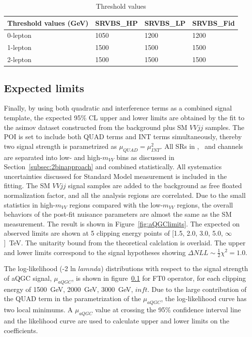 \begin{table}[ht!]
\small
\begin{center}
\begin{tabular}{ | l || l | l | l |}
\hline
Threshold values (GeV)          & SRVBS\_HP  & SRVBS\_LP & SRVBS\_Fid  \tabularnewline \hline
0-lepton & 1050      & 1200     & 1200       \tabularnewline \hline
1-lepton & 1500      & 1500     & 1500       \tabularnewline \hline
2-lepton & 1500      & 1500     & 1500       \tabularnewline \hline
\end{tabular}
\caption{Threshold values}
\label{tab:2binthreshold}
\end{center}
\end{table}

\subsection{Expected limits}
Finally, by using both quadratic and interference terms as a combined signal template, the expected 95\% CL upper and lower limits are obtained by the fit to the asimov dataset constructed from the background plus SM $VVjj$ samples.
The POI is set to include both QUAD terms and INT terms simultaneously, thereby two signal strength is parametrized as $\mu_{QUAD} = \mu_{INT}^2$.
All SRs in \zlep, \olep\ and \tlep channels are separated into low- and high-$m_{VV}$ bins as discussed in Section~\ref{subsec:2binapproach} and combined statistically.
All systematics uncertainties discussed for Standard Model measurement is included in the fitting.
The SM $VVjj$ signal samples are added to the background as free floated normalization factor, and all the analysis regions are correlated.
Due to the small statistics in high-$m_{VV}$ regions compared with the low-$m_{VV}$ regions,
the overall behaviors of the post-fit nuisance parameters are almost the same as the SM measurement.
The result is shown in Figure~\ref{fig:aQGClimits}.
The expected on abserved limits are shown at 5 clipping energy points of [1.5, 2.0, 3.0, 5.0, $\infty$]~TeV.
The unitarity bound from the theoretical calclation \cite{PhysRevD.101.113003} is overlaid.
The upper and lower limits correspond to the signal hypotheses showing $\Delta NLL \sim \frac{1}{2}\chi^2 = 1.0$.

The log-likelihood (-2 ln $lamnda$) distributions with respect to the signal strength of aQGC signal, $\mu_{aQGC}$, is shown in figure~\ref{} for FT0 operator, for each clipping energy of 1500~GeV, 2000~GeV, 3000~GeV, $inft$.
Due to the large contribution of the QUAD term in the parametrization of the $\mu_{aQGC}$, the log-likelihood curve has two local minimums.
A $\mu_{aQGC}$ value at crossing the 95\% confidence interval line and the likelihood curve are used to calculate upper and lower limits on the coefficients. 

